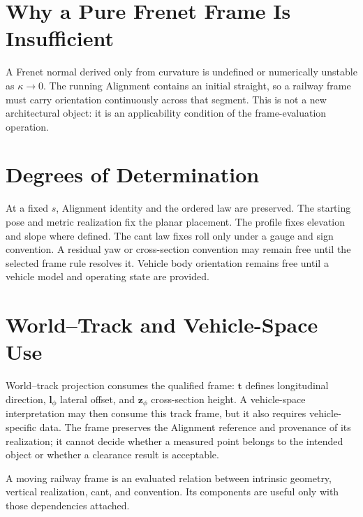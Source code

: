 \section{Why a Pure Frenet Frame Is Insufficient}

A Frenet normal derived only from curvature is undefined or numerically
unstable as \(\kappa\rightarrow0\). The running Alignment contains an initial
straight, so a railway frame must carry orientation continuously across that
segment. This is not a new architectural object: it is an applicability
condition of the frame-evaluation operation.

\section{Degrees of Determination}

At a fixed \(s\), Alignment identity and the ordered law are preserved.
The starting pose and metric realization fix the planar placement. The
profile fixes elevation and slope where defined. The cant law fixes roll only
under a gauge and sign convention. A residual yaw or cross-section convention
may remain free until the selected frame rule resolves it. Vehicle body
orientation remains free until a vehicle model and operating state are
provided.

\section{World--Track and Vehicle-Space Use}

World--track projection consumes the qualified frame: \(\mathbf t\) defines
longitudinal direction, \(\mathbf l_\phi\) lateral offset, and
\(\mathbf z_\phi\) cross-section height. A vehicle-space interpretation may
then consume this track frame, but it also requires vehicle-specific data. The
frame preserves the Alignment reference and provenance of its realization; it
cannot decide whether a measured point belongs to the intended object or
whether a clearance result is acceptable.

\begin{summary}
A moving railway frame is an evaluated relation between intrinsic geometry,
vertical realization, cant, and convention. Its components are useful only
with those dependencies attached.
\end{summary}
